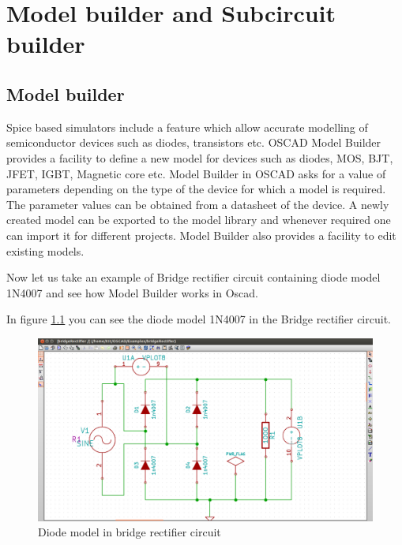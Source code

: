 \chapter {Model builder and Subcircuit builder}
\section {Model builder}


Spice based simulators include a feature which allow accurate modelling of semiconductor devices such as diodes, transistors etc. OSCAD Model Builder provides a facility to define a new model for devices such as diodes, MOS, BJT, JFET, IGBT, Magnetic core etc. Model Builder in OSCAD asks for a value of parameters depending on the type of the device for which a model is required. The parameter values can be obtained from a datasheet of the device. A newly created model can be exported to the model library and whenever required one can import it for different projects. Model Builder also provides a facility to edit existing models. 

Now let us take an example of Bridge rectifier circuit containing diode model 1N4007 and see how Model Builder works in Oscad.

In figure \ref{diode} you can see the diode model 1N4007 in the Bridge rectifier circuit.

\begin{figure}[h]%
\begin{center}
\includegraphics[width=1\linewidth]{figures/B-Rectifier-schematic.png}%
\caption{Diode model in bridge rectifier circuit}
\label{diode}
\end{center}
\end{figure}

